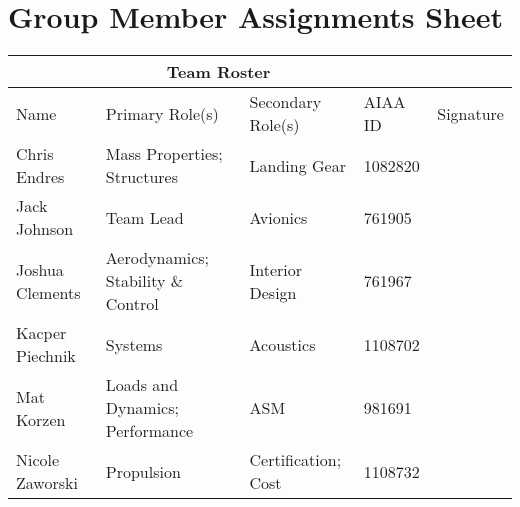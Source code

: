 \documentclass[conf]{new-aiaa}
\begin{document}
\section*{Group Member Assignments Sheet}
\begin{center}
    \begin{tabular}{ |p{3cm}||p{3cm}|p{3cm}|p{1.5cm}|p{3cm}| }\toprule
         \multicolumn{4}{c}{Team Roster} \\\midrule
         Name & Primary Role(s) & Secondary Role(s) & AIAA ID & Signature \\\hline
         
         Chris Endres & Mass Properties; \newline Structures & Landing Gear & 1082820 & \\
         Jack Johnson & Team Lead & Avionics & 761905 & \\ 
         Joshua Clements & Aerodynamics; \newline Stability \& Control & Interior Design & 761967 & \\ 
         Kacper Piechnik & Systems & Acoustics & 1108702 & \\ 
         Mat Korzen & Loads and Dynamics; \newline Performance & ASM & 981691 & \\ 
         Nicole Zaworski & Propulsion & Certification; Cost & 1108732 & \\\bottomrule 
    \end{tabular}
\end{center}


\newpage

\tableofcontents

\newpage
\end{document}
